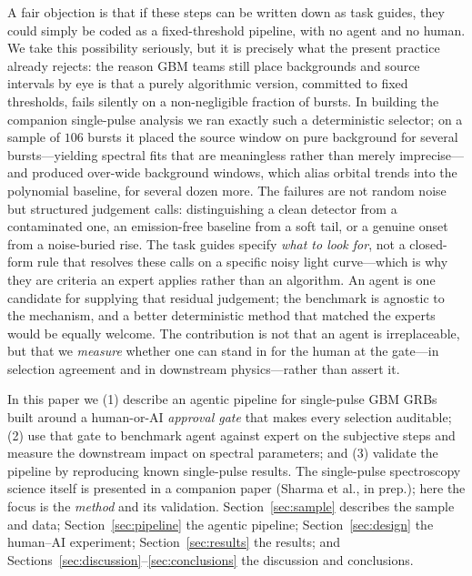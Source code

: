 \documentclass[twocolumn]{aastex631}
\begin{document}
A fair objection is that if these steps can be written down as task guides, they could
simply be coded as a fixed-threshold pipeline, with no agent and no human. We take this
possibility seriously, but it is precisely what the present practice already rejects:
the reason GBM teams still place backgrounds and source intervals by eye is that a
purely algorithmic version, committed to fixed thresholds, fails silently on a
non-negligible fraction of bursts. In building the companion single-pulse analysis we
ran exactly such a deterministic selector; on a sample of $106$ bursts it placed the
source window on pure background for several bursts---yielding spectral fits that are
meaningless rather than merely imprecise---and produced over-wide background windows,
which alias orbital trends into the polynomial baseline, for several dozen more. The
failures are not random noise but structured judgement calls: distinguishing a clean
detector from a contaminated one, an emission-free baseline from a soft tail, or a
genuine onset from a noise-buried rise. The task guides specify \emph{what to look for},
not a closed-form rule that resolves these calls on a specific noisy light curve---which
is why they are criteria an expert applies rather than an algorithm. An agent is one
candidate for supplying that residual judgement; the benchmark is agnostic to the
mechanism, and a better deterministic method that matched the experts would be equally
welcome. The contribution is not that an agent is irreplaceable, but that we
\emph{measure} whether one can stand in for the human at the gate---in selection
agreement and in downstream physics---rather than assert it.

In this paper we (1) describe an agentic pipeline for single-pulse GBM GRBs built
around a human-or-AI \emph{approval gate} that makes every selection auditable;
(2) use that gate to benchmark agent against expert on the subjective steps and
measure the downstream impact on spectral parameters; and (3) validate the
pipeline by reproducing known single-pulse results. The single-pulse spectroscopy
science itself is presented in a companion paper (Sharma et al., in prep.); here the
focus is the \emph{method} and its validation. Section~\ref{sec:sample} describes
the sample and data; Section~\ref{sec:pipeline} the agentic pipeline;
Section~\ref{sec:design} the human--AI experiment; Section~\ref{sec:results} the
results; and Sections~\ref{sec:discussion}--\ref{sec:conclusions} the discussion
and conclusions.

\end{document}
